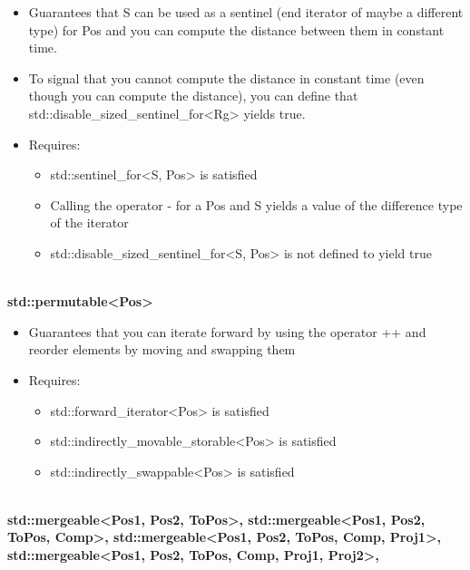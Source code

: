 \begin{itemize}
\item
Guarantees that S can be used as a sentinel (end iterator of maybe a different type) for Pos and you can compute the distance between them in constant time.

\item
To signal that you cannot compute the distance in constant time (even though you can compute the distance), you can define that std::disable\_sized\_sentinel\_for<Rg> yields true.

\item
Requires:
\begin{itemize}
\item
std::sentinel\_for<S, Pos> is satisfied

\item
Calling the operator - for a Pos and S yields a value of the difference type of the iterator

\item
std::disable\_sized\_sentinel\_for<S, Pos> is not defined to yield true
\end{itemize}
\end{itemize}


\noindent
\hspace*{\fill} \\ %
\textbf{std::permutable<Pos>}

\begin{itemize}
\item
Guarantees that you can iterate forward by using the operator ++ and reorder elements by moving and swapping them

\item
Requires:
\begin{itemize}
\item
std::forward\_iterator<Pos> is satisfied

\item
std::indirectly\_movable\_storable<Pos> is satisfied

\item
std::indirectly\_swappable<Pos> is satisfied
\end{itemize}
\end{itemize}

\noindent
\hspace*{\fill} \\ %
\textbf{std::mergeable<Pos1, Pos2, ToPos>,
std::mergeable<Pos1, Pos2, ToPos, Comp>,
std::mergeable<Pos1, Pos2, ToPos, Comp, Proj1>,
std::mergeable<Pos1, Pos2, ToPos, Comp, Proj1, Proj2>,}

